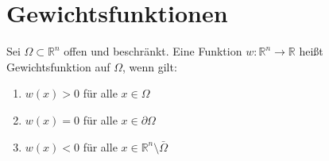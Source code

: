 \section{Gewichtsfunktionen}
\begin{definition}
Sei $\Omega \subset \mathbb{R}^n$ offen und beschränkt. Eine Funktion $w:\mathbb{R}^n \rightarrow \mathbb{R}$ heißt Gewichtsfunktion auf $\Omega$, wenn gilt:
\begin{enumerate}
\item $w(x) > 0$ für alle $x \in \Omega$
\item $w(x) = 0$ für alle $x \in \partial \Omega$
\item $w(x) < 0$ für alle $x \in \mathbb{R}^n \setminus \bar{\Omega}$
\end{enumerate}
\end{definition}

